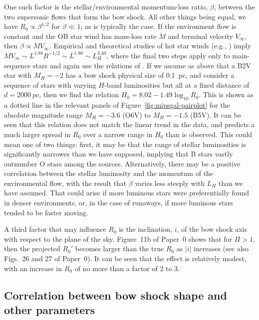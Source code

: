 \documentclass[useAMS, usenatbib, a4paper]{mnras}
\begin{document}
One such factor is the stellar/environmental momentum-loss ratio,
\(\beta\), between the two supersonic flows that form the bow shock.  All
other things being equal, we have \(R_0 \propto \beta^{1/2}\) for
\(\beta \ll 1\), as is typically the case.  If the environment flow is
constant and the OB star wind has mass-loss rate \(\dot{M}\) and
terminal velocity \(V_\infty\), then
\(\beta \propto \dot{M}{V_\infty}\).  Empirical and theoretical studies of hot star
winds (e.g., \citealp{Puls:1996a}) imply
\(\dot{M}{V_\infty} \sim L^{1.88} R^{-1/2} \sim L^{1.80} \sim L_H^{3.40}\), where
the final two steps apply only to main-sequence stars and again use
the relations of \citet{Eker:2015a}.  If we assume as above that a B2V
star with \(M_H = -2\) has a bow shock physical size of \SI{0.1}{pc},
and consider a sequence of stars with varying \(H\)-band luminosities
but all at a fixed distance of \(d = \SI{2000}{pc}\), then we find the
relation \(H_0 = 8.02 - 1.49 \log_{10} R_0\).  This is shown as a
dotted line in the relevant panels of
Figure~\ref{fig:mipsgal-pairplot} for the absolute magnitude range
\(M_H = -3.6\) (O6V) to \(M_H = -1.5\) (B5V).  It can be seen that
this relation does not match the linear trend in the data, and
predicts a much larger spread in \(R_0\) over a narrow range in
\(H_0\) than is observed.  This could mean one of two things: first,
it may be that the range of stellar luminosities is significantly
narrower than we have supposed, implying that B stars vastly outnumber
O stars among the sources.  Alternatively, there may be a positive
correlation between the stellar luminosity and the momentum of the
environmental flow, with the result that \(\beta\) varies less steeply
with \(L_H\) than we have assumed.  That could arise if more luminous
stars were preferentially found in denser environments, or, in the
case of runaways, if more luminous stars tended to be faster moving.

A third factor that may influence \(R_0\) is the inclination, \(i\),
of the bow shock axis with respect to the plane of the sky.
Figure~11b of Paper~0 shows that for \(\Pi > 1\), then the projected
\(R_0'\) becomes larger than the true \(R_0\) as \(|i|\) increases
(see also Figs.~26 and 27 of Paper~0).  It can be seen that the effect
is relatively modest, with an increase in \(R_0\) of no more than a
factor of 2 to 3.


\subsection{Correlation between bow shock shape and other parameters}
\label{sec:corr-shape}
\end{document}
